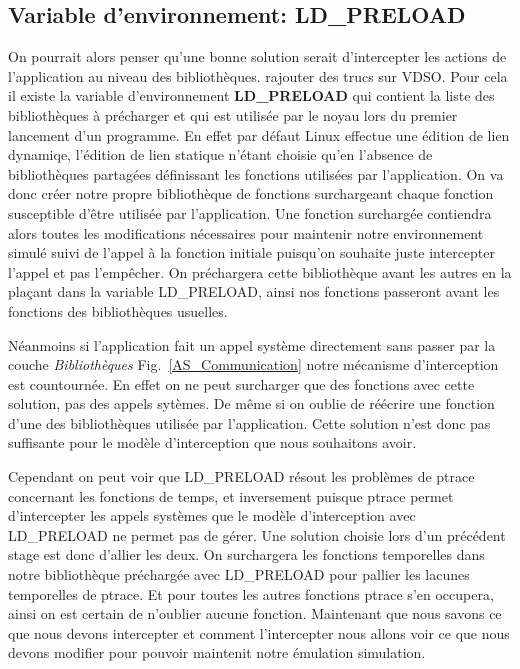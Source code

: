 \subsection{Variable d'environnement: LD\_PRELOAD}
On pourrait alors penser qu'une bonne solution serait d'intercepter les actions
de l'application au niveau des bibliothèques.{\color{red} rajouter des trucs sur
  VDSO}. Pour cela il existe la variable d'environnement \textbf{LD\_PRELOAD}
qui contient la liste des bibliothèques à précharger et qui est utilisée par le
noyau lors du premier lancement d'un programme. En effet par défaut Linux
effectue une édition de lien dynamiqe, l'édition de lien statique n'étant
choisie qu'en l'absence de bibliothèques partagées définissant les fonctions
utilisées par l'application. On va donc créer notre propre bibliothèque de
fonctions surchargeant chaque fonction susceptible d'être utilisée par
l'application. Une fonction surchargée contiendra alors toutes les modifications
nécessaires pour maintenir notre environnement simulé suivi de l'appel à la
fonction initiale puisqu'on souhaite juste intercepter l'appel et pas
l'empêcher. On préchargera cette bibliothèque avant les autres en la plaçant
dans la variable LD\_PRELOAD, ainsi nos fonctions passeront avant les fonctions
des bibliothèques usuelles.

Néanmoins si l'application fait un appel système directement sans passer par la
couche \textit{Bibliothèques} Fig.~\ref{AS_Communication} notre mécanisme
d'interception est countournée. En effet on ne peut surcharger que des fonctions
avec cette solution, pas des appels sytèmes. De même si on oublie de réécrire
une fonction d'une des bibliothèques utilisée par l'application. Cette solution
n'est donc pas suffisante pour le modèle d'interception que nous souhaitons
avoir.

Cependant on peut voir que LD\_PRELOAD résout les problèmes de ptrace concernant
les fonctions de temps, et inversement puisque ptrace permet d'intercepter les
appels systèmes que le modèle d'interception avec LD\_PRELOAD ne permet pas de
gérer. Une solution choisie lors d'un précédent stage est donc d'allier les
deux. On surchargera les fonctions temporelles dans notre bibliothèque
préchargée avec LD\_PRELOAD pour pallier les lacunes temporelles de ptrace. Et
pour toutes les autres fonctions ptrace s'en occupera, ainsi on est certain de
n'oublier aucune fonction. Maintenant que nous savons ce que nous devons
intercepter et comment l'intercepter nous allons voir ce que nous devons
modifier pour pouvoir maintenit notre émulation simulation.

